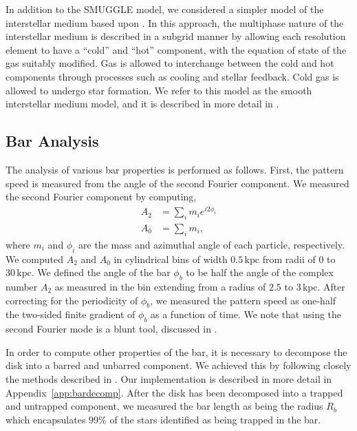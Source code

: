 \documentclass[twocolumn,linenumbers,trackchanges]{aastex631}
\newcommand{\SMUGGLE}{SMUGGLE}
\begin{document}
In addition to the \SMUGGLE{} model, we considered a simpler model of the
interstellar medium based upon \citet{2003MNRAS.339..289S}. In this approach,
the multiphase nature of the interstellar medium is described in a subgrid
manner by allowing each resolution element to have a ``cold'' and ``hot''
component, with the equation of state of the gas suitably modified. Gas is
allowed to interchange between the cold and hot components through processes
such as cooling and stellar feedback. Cold gas is allowed to undergo star
formation. We refer to this model as the smooth interstellar medium model, and
it is described in more detail in \citet{2019MNRAS.489.4233M}.

\subsection{Bar Analysis}
\label{ssec:bar_analysis}
The analysis of various bar properties is performed as follows. First, the
pattern speed is measured from the angle of the second Fourier component. We
measured the second Fourier component by computing,
\begin{equation}
\begin{split}
A_2 &= \sum_i m_i e^{i 2 \phi_i} \\
A_0 &= \sum_i m_i \textrm{,}
\end{split}
\end{equation}
where $m_i$ and $\phi_i$ are the mass and azimuthal angle of each particle,
respectively. We computed $A_2$ and $A_0$ in cylindrical bins of width
$0.5\,\textrm{kpc}$ from radii of $0$ to $30\,\textrm{kpc}$. We defined the
angle of the bar $\phi_b$ to be half the angle of the complex number $A_2$
as measured in the bin extending from a radius of $2.5$ to $3\,\textrm{kpc}$.
After correcting for the periodicity of $\phi_b$, we measured the pattern speed
as one-half the two-sided finite gradient of $\phi_b$ as a function of time.
We note that using the second Fourier mode is a blunt tool, discussed in
\citet{2019arXiv190308203P}.

In order to compute other properties of the bar, it is necessary to decompose
the disk into a barred and unbarred component. We achieved this by following
closely the methods described in \citet{2016MNRAS.463.1952P,
2021MNRAS.500..838P}. Our implementation is described in more detail in
Appendix~\ref{app:bardecomp}. After the disk has been decomposed into a trapped
and untrapped component, we measured the bar length as being the radius $R_b$
which encapsulates $99\%$ of the stars identified as being trapped in the bar.
\end{document}
